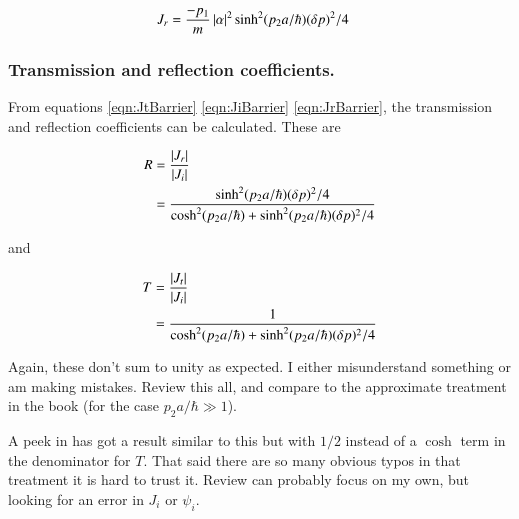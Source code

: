 \documentclass{article}
\begin{document}
\begin{align}\label{eqn:JrBarrier}
J_r
&= \frac{-p_1}{m} \left\lvert{\alpha}\right\rvert^2 \sinh^2(p_2 a/\hbar) (\delta p)^2/4
\end{align}

\subsubsection{Transmission and reflection coefficients. }

From equations \ref{eqn:JtBarrier} \ref{eqn:JiBarrier} \ref{eqn:JrBarrier}, the transmission and reflection coefficients can be calculated.
These are

\begin{align*}
R &=
\frac{\left\lvert{J_r}\right\rvert} {\left\lvert{J_i}\right\rvert} \\
&=
\frac{\sinh^2(p_2 a/\hbar) (\delta p)^2/4}{ \cosh^2(p_2 a/\hbar) + \sinh^2(p_2 a/\hbar) (\delta p)^2/4 }
\end{align*}

and

\begin{align*}
T &=
\frac{\left\lvert{J_t}\right\rvert} {\left\lvert{J_i}\right\rvert} \\
&=
\frac{1}{ \cosh^2(p_2 a/\hbar) + \sinh^2(p_2 a/\hbar) (\delta p)^2/4 }
\end{align*}

Again, these don't sum to unity as expected.  I either misunderstand something or am making mistakes.  Review this all, and compare to the approximate treatment in the book (for the case $p_2 a/\hbar \gg 1$).

A peek in \cite{mcmahon2005qmd} has got a result similar to this
but with $1/2$ instead of a $\cosh$ term in the denominator for $T$.  That
said there are so many obvious typos in that treatment it is hard 
to trust it.  Review
can probably focus on my own, but looking for an error in $J_i$ or $\psi_i$.



\end{document}

